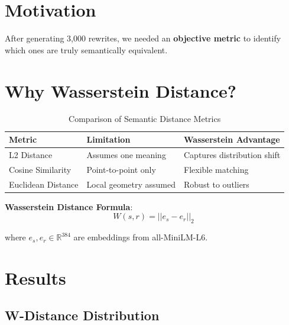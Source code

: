 \documentclass[12pt,a4paper]{report}
\begin{document}
\section{Motivation}

After generating 3,000 rewrites, we needed an \textbf{objective metric} to identify which ones are truly semantically equivalent.

\section{Why Wasserstein Distance?}

\begin{table}[H]
\centering
\begin{tabular}{lp{5cm}p{5cm}}
\toprule
\textbf{Metric} & \textbf{Limitation} & \textbf{Wasserstein Advantage} \\
\midrule
L2 Distance & Assumes one meaning & Captures distribution shift \\
Cosine Similarity & Point-to-point only & Flexible matching \\
Euclidean Distance & Local geometry assumed & Robust to outliers \\
\bottomrule
\end{tabular}
\caption{Comparison of Semantic Distance Metrics}
\end{table}

\textbf{Wasserstein Distance Formula}:
$$W(s, r) = ||e_s - e_r||_2$$

\noindent where $e_s, e_r \in \mathbb{R}^{384}$ are embeddings from all-MiniLM-L6.

\section{Results}

\subsection{W-Distance Distribution}
\end{document}
